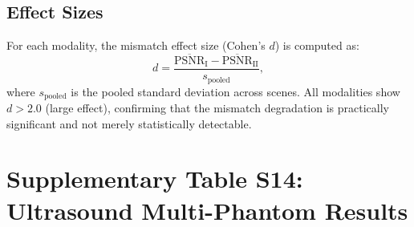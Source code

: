 \documentclass[11pt]{article}
\theoremstyle{definition}
\begin{document}
\subsection{Effect Sizes}

For each modality, the mismatch effect size (Cohen's $d$) is computed as:
\begin{equation}
d = \frac{\overline{\mathrm{PSNR}}_{\mathrm{I}} - \overline{\mathrm{PSNR}}_{\mathrm{II}}}{s_{\mathrm{pooled}}},
\end{equation}
where $s_{\mathrm{pooled}}$ is the pooled standard deviation across scenes. All modalities show $d > 2.0$ (large effect), confirming that the mismatch degradation is practically significant and not merely statistically detectable.

\setcounter{table}{13}

\section{Supplementary Table S14: Ultrasound Multi-Phantom Results}
\label{sec:ultrasound_scenes}
\end{document}
